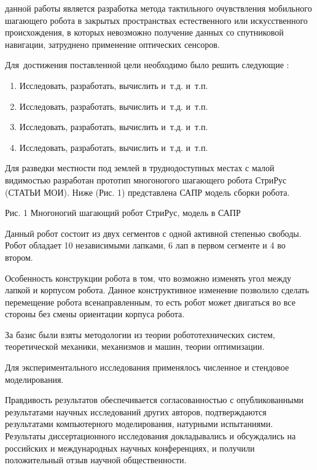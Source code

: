 {\aim} данной работы является разработка метода тактильного очувствления мобильного шагающего робота в закрытых пространствах естественного или искусственного происхождения, в которых невозможно получение данных со спутниковой навигации, затруднено применение оптических сенсоров.

Для~достижения поставленной цели необходимо было решить следующие {\tasks}:
\begin{enumerate}[beginpenalty=10000] %
  \item Исследовать, разработать, вычислить и~т.\:д. и~т.\:п.
  \item Исследовать, разработать, вычислить и~т.\:д. и~т.\:п.
  \item Исследовать, разработать, вычислить и~т.\:д. и~т.\:п.
  \item Исследовать, разработать, вычислить и~т.\:д. и~т.\:п.
\end{enumerate}

{\researchobj}
Для разведки местности под землей в труднодоступных местах с малой видимостью разработан прототип многоногого шагающего робота СтриРус (СТАТЬИ МОИ). Ниже (Рис. 1) представлена САПР модель сборки робота.

Рис. 1 Многоногий шагающий робот СтриРус, модель в САПР

Данный робот состоит из двух сегментов с одной активной степенью свободы. Робот обладает 10 независимыми лапками, 6 лап в первом сегменте и 4 во втором.

Особенность конструкции робота в том, что возможно изменять угол между лапкой и корпусом робота. Данное конструктивное изменение позволило сделать перемещение робота всенаправленным, то есть робот может двигаться во все стороны без смены ориентации корпуса робота.


{\methods} За базис были взяты методологии из теории робототехнических систем, теоретической механики, механизмов и машин, теории оптимизации.

Для экспериментального исследования применялось численное и стендовое моделирования.

{\reliability} Правдивость результатов обеспечивается согласованностью с опубликованными результатами научных исследований других авторов, подтверждаются результатами компьютерного моделирования, натурными испытаниями. Результаты диссертационного исследования докладывались и обсуждались на российских и международных научных конференциях, и получили положительный отзыв научной общественности.


